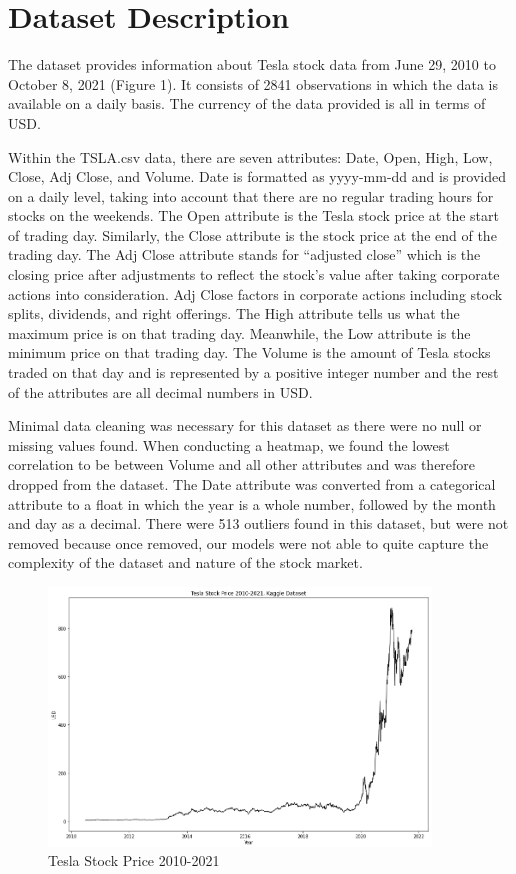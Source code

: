 \documentclass[12pt,a4paper]{article}
\begin{document}
\section{Dataset Description}
The dataset provides information about Tesla stock data from June 29, 2010 to October 8, 2021 (Figure 1). It consists of 2841 observations in which the data is available on a daily basis. The currency of the data provided is all in terms of USD. 

Within the TSLA.csv data, there are seven attributes: Date, Open, High, Low, Close, Adj Close, and Volume. Date is formatted as yyyy-mm-dd and is provided on a daily level, taking into account that there are no regular trading hours for stocks on the weekends. The Open attribute is the Tesla stock price at the start of trading day. Similarly, the Close attribute is the stock price at the end of the trading day. The Adj Close attribute stands for “adjusted close” which is the closing price after adjustments to reflect the stock’s value after taking corporate actions into consideration. Adj Close factors in corporate actions including stock splits, dividends, and right offerings. The High attribute tells us what the maximum price is on that trading day. Meanwhile, the Low attribute is the minimum price on that trading day. The Volume is the amount of Tesla stocks traded on that day and is represented by a positive integer number and the rest of the attributes are all decimal numbers in USD. 

Minimal data cleaning was necessary for this dataset as there were no null or missing values found. When conducting a heatmap, we found the lowest correlation to be between Volume and all other attributes and was therefore dropped from the dataset. The Date attribute was converted from a categorical attribute to a float in which the year is a whole number, followed by the month and day as a decimal. There were 513 outliers found in this dataset, but were not removed because once removed, our models were not able to quite capture the complexity of the dataset and nature of the stock market. 

\begin{figure}[h]
\caption{Tesla Stock Price 2010-2021}
\centering
\includegraphics[width=4in]{./Figures/TSLA.png}
\end{figure}
\end{document}
